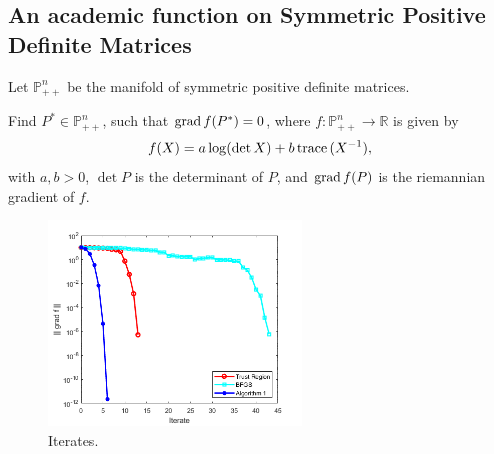 \subsection{An academic function on Symmetric Positive Definite Matrices }

Let $ \mathbb{P}^n_{++}$ be the manifold of symmetric positive definite matrices.

\begin{problem}Find $P^* \in \mathbb{P}^n_{++}$, such that $\operatorname{grad} f(P^*) =0$, where $f:\mathbb{P}^n_{++} \to \mathbb{R}$ is given by 
\begin{equation} \label{pr:academicfunction}
f(X) = a \log(\det X) + b \,\mbox{trace}\, (X^{-1}),
\end{equation}
with $a,b > 0$, $\det P$ is the determinant of $P$,   and $\operatorname{grad} f(P)$ is the riemannian gradient of $f$.
\end{problem}


\begin{figure}
	\centering
	\includegraphics[width=0.6\textwidth]{logdet_iter.png}
	\caption{Iterates.}
	\label{fig:logdetfig}
\end{figure}


